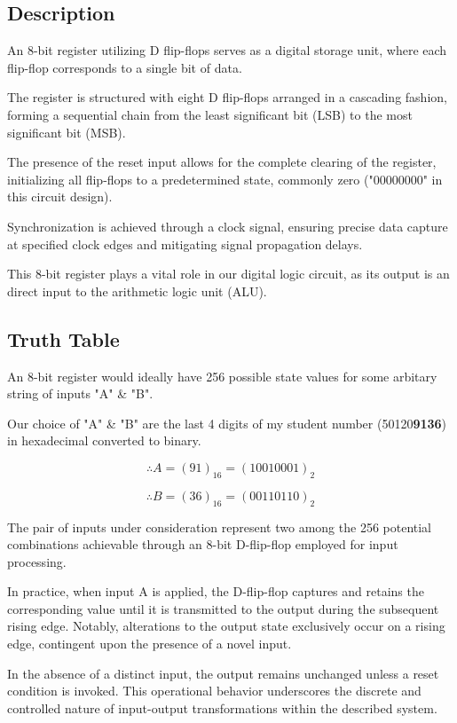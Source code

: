 
\subsection{{Description}}

	{An 8-bit register utilizing D flip-flops serves as a digital storage unit, where each flip-flop corresponds to a single bit of data.} 
	
	{The register is structured with eight D flip-flops arranged in a cascading fashion, forming a sequential chain from the least significant bit (LSB) to the most significant bit (MSB).} 
	
	{The presence of the reset input allows for the complete clearing of the register, initializing all flip-flops to a predetermined state, commonly zero ("00000000" in this circuit design).} 
	
	{Synchronization is achieved through a clock signal, ensuring precise data capture at specified clock edges and mitigating signal propagation delays.} 
	
	{This 8-bit register plays a vital role in our digital logic circuit, as its output is an direct input to the arithmetic logic unit (ALU).}

\subsection{{Truth Table}}

	{An 8-bit register would ideally have 256 possible state values for some arbitary string of inputs "A" \& "B".}
	
	{Our choice of "A" \& "B" are the last 4 digits of my student number (50120\textbf{9136}) in hexadecimal converted to binary.}
	
	{$$\therefore A = (91)_{16} = (10010001)_{2}$$}
	
	{$$\therefore B = (36)_{16} = (00110110)_{2}$$}

	{The pair of inputs under consideration represent two among the 256 potential combinations achievable through an 8-bit D-flip-flop employed for input processing.}
	
	{In practice, when input A is applied, the D-flip-flop captures and retains the corresponding value until it is transmitted to the output during the subsequent rising edge. Notably, alterations to the output state exclusively occur on a rising edge, contingent upon the presence of a novel input.}
	
	{In the absence of a distinct input, the output remains unchanged unless a reset condition is invoked. This operational behavior underscores the discrete and controlled nature of input-output transformations within the described system.}

